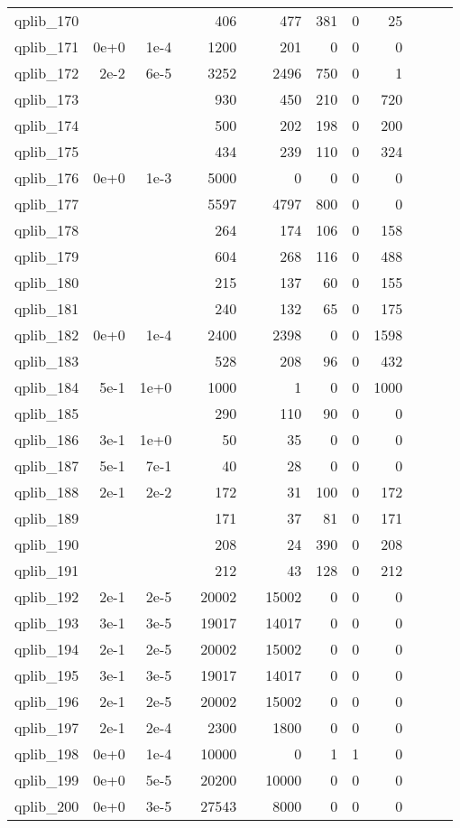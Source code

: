 \begin{table}
\begin{tabular}{lrrrrrrrrrrrr}
qplib\_170	&		&		&	&	406	&	&	477	&	381	&	0	&	25	\\
qplib\_171	&	0e+0	&	1e-4	&	&	1200	&	&	201	&	0	&	0	&	0	\\
qplib\_172	&	2e-2	&	6e-5	&	&	3252	&	&	2496	&	750	&	0	&	1	\\
qplib\_173	&		&		&	&	930	&	&	450	&	210	&	0	&	720	\\
qplib\_174	&		&		&	&	500	&	&	202	&	198	&	0	&	200	\\
qplib\_175	&		&		&	&	434	&	&	239	&	110	&	0	&	324	\\
qplib\_176	&	0e+0	&	1e-3	&	&	5000	&	&	0	&	0	&	0	&	0	\\
qplib\_177	&		&		&	&	5597	&	&	4797	&	800	&	0	&	0	\\
qplib\_178	&		&		&	&	264	&	&	174	&	106	&	0	&	158	\\
qplib\_179	&		&		&	&	604	&	&	268	&	116	&	0	&	488	\\
qplib\_180	&		&		&	&	215	&	&	137	&	60	&	0	&	155	\\
qplib\_181	&		&		&	&	240	&	&	132	&	65	&	0	&	175	\\
qplib\_182	&	0e+0	&	1e-4	&	&	2400	&	&	2398	&	0	&	0	&	1598	\\
qplib\_183	&		&		&	&	528	&	&	208	&	96	&	0	&	432	\\
qplib\_184	&	5e-1	&	1e+0	&	&	1000	&	&	1	&	0	&	0	&	1000	\\
qplib\_185	&		&		&	&	290	&	&	110	&	90	&	0	&	0	\\
qplib\_186	&	3e-1	&	1e+0	&	&	50	&	&	35	&	0	&	0	&	0	\\
qplib\_187	&	5e-1	&	7e-1	&	&	40	&	&	28	&	0	&	0	&	0	\\
qplib\_188	&	2e-1	&	2e-2	&	&	172	&	&	31	&	100	&	0	&	172	\\
qplib\_189	&		&		&	&	171	&	&	37	&	81	&	0	&	171	\\
qplib\_190	&		&		&	&	208	&	&	24	&	390	&	0	&	208	\\
qplib\_191	&		&		&	&	212	&	&	43	&	128	&	0	&	212	\\
qplib\_192	&	2e-1	&	2e-5	&	&	20002	&	&	15002	&	0	&	0	&	0	\\
qplib\_193	&	3e-1	&	3e-5	&	&	19017	&	&	14017	&	0	&	0	&	0	\\
qplib\_194	&	2e-1	&	2e-5	&	&	20002	&	&	15002	&	0	&	0	&	0	\\
qplib\_195	&	3e-1	&	3e-5	&	&	19017	&	&	14017	&	0	&	0	&	0	\\
qplib\_196	&	2e-1	&	2e-5	&	&	20002	&	&	15002	&	0	&	0	&	0	\\
qplib\_197	&	2e-1	&	2e-4	&	&	2300	&	&	1800	&	0	&	0	&	0	\\
qplib\_198	&	0e+0	&	1e-4	&	&	10000	&	&	0	&	1	&	1	&	0	\\
qplib\_199	&	0e+0	&	5e-5	&	&	20200	&	&	10000	&	0	&	0	&	0	\\
qplib\_200	&	0e+0	&	3e-5	&	&	27543	&	&	8000	&	0	&	0	&	0	\\



\end{tabular}
\end{table}
